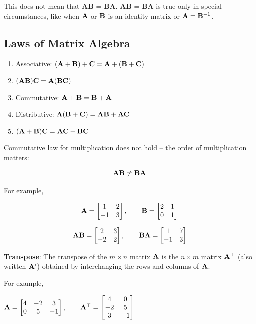 \documentclass[
  letterpaper,
]{book}
\providecommand{\tightlist}{%
  \setlength{\itemsep}{0pt}\setlength{\parskip}{0pt}}\usepackage{longtable,booktabs,array}
\theoremstyle{definition}
\theoremstyle{definition}
\theoremstyle{plain}
\theoremstyle{definition}
\theoremstyle{plain}
\theoremstyle{plain}
\theoremstyle{remark}
\begin{document}
This does not mean that \textbf{AB} = \textbf{BA}. \textbf{AB} =
\textbf{BA} is true only in special circumstances, like when \({\bf A}\)
or \({\bf B}\) is an identity matrix or \({\bf A} = {\bf B}^{-1}\).

\hypertarget{laws-of-matrix-algebra}{%
\subsection{Laws of Matrix Algebra}\label{laws-of-matrix-algebra}}

\begin{enumerate}
\def\labelenumi{\arabic{enumi}.}
\tightlist
\item
  Associative: \(\bf (A+B)+C = A+(B+C)\)
\item
  \(\bf (AB)C = A(BC)\)
\item
  Commutative: \(\bf A+B=B+A\)
\item
  Distributive: \(\bf A(B+C)=AB+AC\)
\item
  \(\bf (A+B)C=AC+BC\)
\end{enumerate}

Commutative law for multiplication does not hold -- the order of
multiplication matters:

\[\bf AB \ne BA\]

For example,

\[{\bf A}=\begin{bmatrix} 1&2\\-1&3\end{bmatrix}, \qquad {\bf B}=\begin{bmatrix} 2&1\\0&1\end{bmatrix}\]

\[{\bf AB}=\begin{bmatrix} 2&3\\-2&2\end{bmatrix}, \qquad {\bf BA}=\begin{bmatrix} 1&7\\-1&3\end{bmatrix}\]

\textbf{Transpose}: The transpose of the \(m\times n\) matrix \(\bf A\)
is the \(n\times m\) matrix \({\bf A}^\top\) (also written \({\bf A}'\))
obtained by interchanging the rows and columns of \(\bf A\).

For example,

\({\bf A}=\begin{bmatrix} 4&-2&3\\0&5&-1\end{bmatrix}, \qquad {\bf A}^\top=\begin{bmatrix} 4&0\\-2&5\\3&-1 \end{bmatrix}\)
\end{document}
